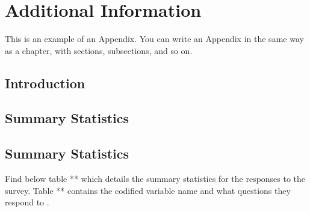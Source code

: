 
\chapter{Additional Information}
This is an example of an Appendix. You can write an Appendix in the same way as a chapter, with sections, subsections, and so on.

\section{Introduction}


\section{Summary Statistics}

\section{Summary Statistics }
Find below table ** which details the summary statistics for the responses to the survey. Table ** contains the codified variable name and what questions they respond to .



